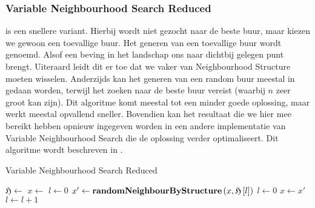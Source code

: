 \subsubsection{Variable Neighbourhood Search Reduced}
 is een snellere variant. Hierbij wordt niet gezocht naar de beste buur, maar kiezen we gewoon een toevallige buur. Het generen van een toevallige buur wordt  genoemd. Alsof een beving in het landschap ons naar dichtbij gelegen punt brengt. Uiteraard leidt dit er toe dat we vaker van Neighbourhood Structure moeten wisselen. Anderzijds kan het generen van een random buur meestal in  gedaan worden, terwijl het zoeken naar de beste buur  vereist (waarbij $n$ zeer groot kan zijn). Dit algoritme komt meestal tot een minder goede oplossing, maar werkt meestal opvallend sneller. Bovendien kan het resultaat die we hier mee bereikt hebben opnieuw ingegeven worden in een andere implementatie van Variable Neighbourhood Search die de oplossing verder optimaliseert. Dit algoritme wordt beschreven in .
\begin{algorithm}[htb]                      %
\caption{Variable Neighbourhood Search Reduced}          %
\label{alg:variableNeighbourhoodSearchReduced}                           %
\begin{algorithmic}[1]                    %
\STATE $\mathfrak{H}\leftarrow$
\STATE $x\leftarrow$
\STATE $l\leftarrow 0$
\STATE $x'\leftarrow\mbox{\bf randomNeighbourByStructure}\left( x,\mathfrak{H}\left[l\right] \right)$
\STATE $l\leftarrow 0$
\STATE $x\leftarrow x'$
\ELSE
\STATE $l\leftarrow l+1$
\ENDIF
\ENDWHILE
\end{algorithmic}
\end{algorithm}
